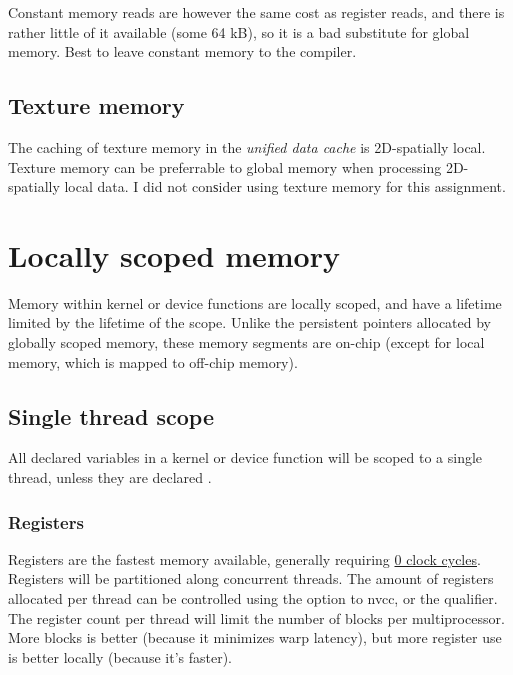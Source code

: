 \documentclass[a4paper,titlepage,12pt]{article}
\begin{document}
\begin{description}[left = \parindent]
Constant memory reads are however  the same cost as register reads, and there is rather little of it available (some 64 kB), so it is a bad substitute for global memory.
Best to leave constant memory to the compiler.

\subsection{Texture memory}

The caching of texture memory in the {\em unified data cache} is 2D-spatially local.
Texture memory can be preferrable to global memory when processing 2D-spatially local data.
I did not conѕider using texture memory for this assignment.

\newpage
\section{Locally scoped memory}

Memory within kernel or device functions are locally scoped, and have a lifetime limited by the lifetime of the scope.
Unlike the persistent pointers allocated by globally scoped memory, these memory segments are on-chip (except for local memory, which is mapped to off-chip memory).


\subsection{Single thread scope}

All declared variables in a kernel or device function will be scoped to a single thread, unless they are declared .

\subsubsection{Registers}

Registers are the fastest memory available, generally requiring \underline{0 clock cycles}.%
Registers will be partitioned along concurrent threads.
The amount of registers allocated per thread can be controlled using the  option to nvcc, or the  qualifier.
The register count per thread will limit the number of blocks per multiprocessor.
More blocks is better (because it minimizes warp latency), but more register use is better locally (because it's faster).


\end{description}
\end{document}
